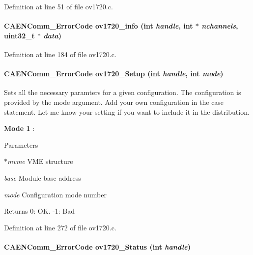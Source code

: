 Definition at line 51 of file ov1720.c.
\paragraph[{ov1720\_\-info}]{\setlength{\rightskip}{0pt plus 5cm}CAENComm\_\-ErrorCode ov1720\_\-info (int {\em handle}, \/  int $\ast$ {\em nchannels}, \/  uint32\_\-t $\ast$ {\em data})}\hfill\label{ov1720_8c_adf1bdbfb68a41b76abe94188d0a8cb7f}


Definition at line 184 of file ov1720.c.
\paragraph[{ov1720\_\-Setup}]{\setlength{\rightskip}{0pt plus 5cm}CAENComm\_\-ErrorCode ov1720\_\-Setup (int {\em handle}, \/  int {\em mode})}\hfill\label{ov1720_8c_a31f37ce79cfd3a277fcc2856b027ef85}
Sets all the necessary paramters for a given configuration. The configuration is provided by the mode argument. Add your own configuration in the case statement. Let me know your setting if you want to include it in the distribution.
\begin{DoxyItemize}
\item {\bfseries Mode 1} :
\end{DoxyItemize}


\begin{DoxyParams}{Parameters}
\item[{\em $\ast$mvme}]VME structure \item[{\em base}]Module base address \item[{\em mode}]Configuration mode number \end{DoxyParams}
\begin{DoxyReturn}{Returns}
0: OK. -\/1: Bad 
\end{DoxyReturn}


Definition at line 272 of file ov1720.c.
\paragraph[{ov1720\_\-Status}]{\setlength{\rightskip}{0pt plus 5cm}CAENComm\_\-ErrorCode ov1720\_\-Status (int {\em handle})}\hfill\label{ov1720_8c_a8228836ab49d61336f0e83ad0c2945bb}


